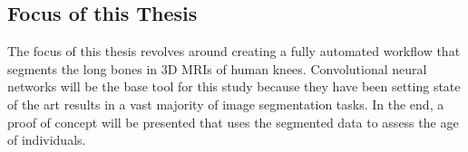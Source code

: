 \subsection{Focus of this Thesis}

The focus of this thesis revolves around creating a fully automated workflow that segments the long bones in 3D MRIs of human knees. Convolutional neural networks will be the base tool for this study because they have been setting state of the art results in a vast majority of image segmentation tasks. In the end, a proof of concept will be presented that uses the segmented data to assess the age of individuals.

\newpage
